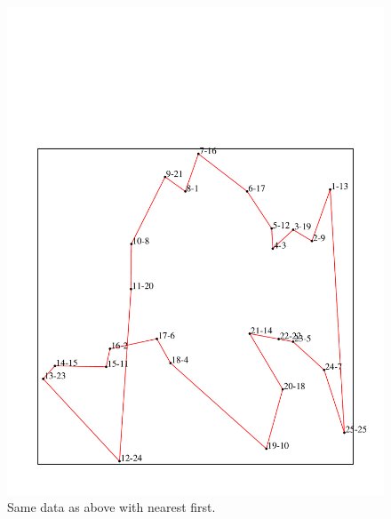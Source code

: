 \begin{figure}[htbp]
  \centering
  \includegraphics[width=1.0\textwidth]{./media/my_samples_simple_greedy.pdf}
  \caption{ \label{Figure_1}Same data as above with nearest first.}
\end{figure}


